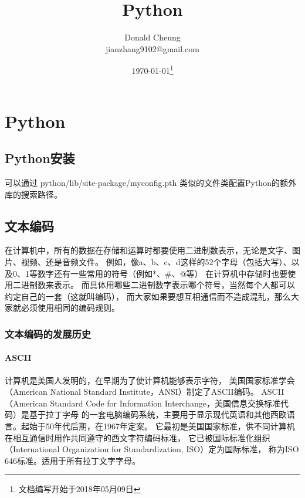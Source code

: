 \ifx\engineeringnotes\undefined
    \providecommand{\notesroot}{../..}
    \providecommand{\pythonroot}{.}

    \title{Python}
    \author{Donald Cheung\\jianzhang9102@gmail.com}
    \date{\today\footnote{文档编写开始于2018年05月09日}}

    
\else
    \providecommand{\pythonroot}{\engineeringroot/Python}
\fi

\chapter{Python}

\section{Python安装}
可以通过 python/lib/site-package/myconfig.pth 类似的文件类配置Python的额外库的搜索路径。

\section{文本编码}
在计算机中，所有的数据在存储和运算时都要使用二进制数表示，无论是文字、图片、视频、还是音频文件。
例如，像a、b、c、d这样的52个字母（包括大写）、以及0、1等数字还有一些常用的符号（例如*、\#、@等）
在计算机中存储时也要使用二进制数来表示。
而具体用哪些二进制数字表示哪个符号，当然每个人都可以约定自己的一套（这就叫编码），
而大家如果要想互相通信而不造成混乱，那么大家就必须使用相同的编码规则。

\subsection{文本编码的发展历史}

\subsubsection{ASCII}
计算机是美国人发明的，在早期为了使计算机能够表示字符，
美国国家标准学会（American National Standard Institute，ANSI）制定了ASCII编码。
ASCII（American Standard Code for Information Interchange，美国信息交换标准代码）是基于拉丁字母
的一套电脑编码系统，主要用于显示现代英语和其他西欧语言。起始于50年代后期，在1967年定案。
它最初是美国国家标准，供不同计算机在相互通信时用作共同遵守的西文字符编码标准，
它已被国际标准化组织（International Organization for Standardization, ISO）定为国际标准，
称为ISO 646标准。适用于所有拉丁文字字母。

